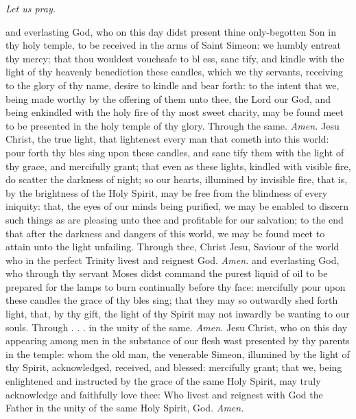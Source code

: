 \centerline{\textit{Let us pray.}}

{} and everlasting God, who on this day didst present thine only-begotten Son in thy holy temple, to be received in the arms of Saint Simeon: we humbly entreat thy mercy; that thou wouldest vouchsafe to bl {} ess, sanc {} tify, and kindle with the light of thy heavenly benediction these candles, which we thy servants, receiving to the glory of thy name, desire to kindle and bear forth: to the intent that we, being made worthy by the offering of them unto thee, the Lord our God, and being enkindled with the holy fire of thy most sweet charity, may be found meet to be presented in the holy temple of thy glory. Through the same. \textit{Amen.}
{} Jesu Christ, the true light, that lightenest every man that cometh into this world: pour forth thy bles {} sing upon these candles, and sanc {} tify them with the light of thy grace, and mercifully grant; that even as these lights, kindled with visible fire, do scatter the darkness of night; so our hearts, illumined by invisible fire, that is, by the brightness of the Holy Spirit, may be free from the blindness of every iniquity: that, the eyes of our minds being purified, we may be enabled to discern such things as are pleasing unto thee and profitable for our salvation; to the end that after the darkness and dangers of this world, we may be found meet to attain unto the light unfailing. Through thee, Christ Jesu, Saviour of the world who in the perfect Trinity livest and reignest God. \textit{Amen.}
{} and everlasting God, who through thy servant Moses didst command the purest liquid of oil to be prepared for the lamps to burn continually before thy face: mercifully pour upon these candles the grace of thy bles {} sing; that they may so outwardly shed forth light, that, by thy gift, the light of thy Spirit may not inwardly be wanting to our souls. Through . . . in the unity of the same. \textit{Amen.}
{} Jesu Christ, who on this day appearing among men in the substance of our flesh wast presented by thy parents in the temple: whom the old man, the venerable Simeon, illumined by the light of thy Spirit, acknowledged, received, and blessed: mercifully grant; that we, being enlightened and instructed by the grace of the same Holy Spirit, may truly acknowledge and faithfully love thee: Who livest and reignest with God the Father in the unity of the same Holy Spirit, God. \textit{Amen.}

